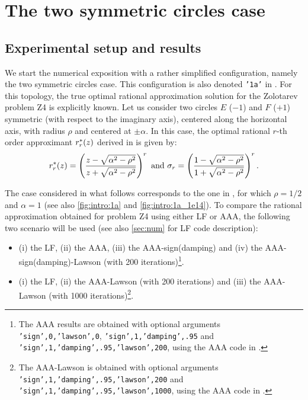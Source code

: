 
\section{The two symmetric circles case}
\label{sec:1a}

\subsection{Experimental setup and results} 

We start the numerical exposition with a rather simplified configuration, namely the two symmetric circles case. This configuration is also denoted \texttt{'1a'} in \cite{trefethen2024computation}. For this topology, the true optimal rational approximation solution for the Zolotarev problem Z4 is explicitly known. Let us consider two circles $E$ ($-1$) and $F$ ($+1$) symmetric (with respect to the imaginary axis), centered along the horizontal axis, with radius $\rho$ and centered at $\pm \alpha$. In this case, the optimal rational $r$-th order approximant $r_r^*(z)$ derived in \cite{starke1992near} is given by:
\begin{equation}
r_r^*(z) = \left(\dfrac{z-\sqrt{\alpha^2-\rho^2}}{z+\sqrt{\alpha^2-\rho^2}}\right)^r
\text{ and }
\sigma_r = \left(\dfrac{1-\sqrt{\alpha^2-\rho^2}}{1+\sqrt{\alpha^2-\rho^2}}\right)^r.
\label{eq:case_1a_opt}
\end{equation}

The case considered in what follows corresponds to the one in \cite[Figure 1(a)]{trefethen2024computation},  for which $\rho = 1/2$ and $\alpha = 1$ (see also \cref{fig:intro:1a} and \cref{fig:intro:1a_1e14}). To compare the rational approximation obtained for problem Z4 using either LF or AAA, the following two scenario will be used (see also \cref{sec:num} for LF code description):
\begin{itemize}
\item[S1] (i) the LF, (ii) the AAA, (iii) the AAA-sign(damping) and (iv) the AAA-sign(damping)-Lawson (with 200 iterations)\footnote{The AAA results are obtained with optional arguments  \texttt{'sign',0,'lawson',0}, \texttt{'sign',1,'damping',.95} and \texttt{'sign',1,'damping',.95,'lawson',200}, using the AAA code in \chebfun.}. 
\item[S2] (i) the LF, (ii) the AAA-Lawson (with 200 iterations) and (iii) the AAA-Lawson (with 1000 iterations)\footnote{The AAA-Lawson is obtained with optional arguments  \texttt{'sign',1,'damping',.95,'lawson',200} and \texttt{'sign',1,'damping',.95,'lawson',1000}, using the AAA code in \chebfun.}. 
\end{itemize}

